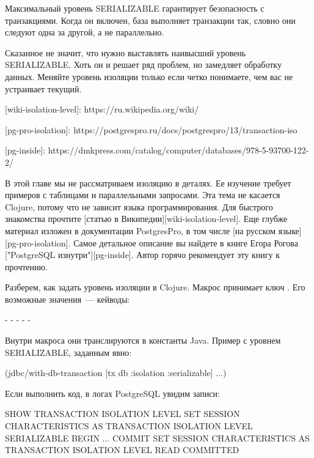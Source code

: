 Максимальный уровень SERIALIZABLE гарантирует безопасность с транзакциями. Когда он включен, база выполняет транзакции так, словно они следуют одна за другой, а не параллельно.

Сказанное не значит, что нужно выставлять наивысший уровень SERIALIZABLE. Хоть он и решает ряд проблем, но замедляет обработку данных. Меняйте уровень изоляции только если четко понимаете, чем вас не устраивает текущий.

[wiki-isolation-level]: https://ru.wikipedia.org/wiki/%

[pg-pro-isolation]: https://postgrespro.ru/docs/postgrespro/13/transaction-iso

[pg-inside]: https://dmkpress.com/catalog/computer/databases/978-5-93700-122-2/

В этой главе мы не рассматриваем изоляцию в деталях. Ее изучение требует примеров с таблицами и параллельными запросами. Эта тема не касается Clojure, потому что не зависит языка программирования. Для быстрого знакомства прочтите [статью в Википедии][wiki-isolation-level]. Еще глубже материал изложен в документации PostgresPro, в том числе [на русском языке][pg-pro-isolation]. Самое детальное описание вы найдете в книге Егора Рогова ["PostgreSQL изнутри"][pg-inside]. Автор горячо рекомендует эту книгу к прочтению.

Разберем, как задать уровень изоляции в Clojure. Макрос  принимает ключ . Его возможные значения~--- кейводы:

- 
- 
- 
- 
- 

Внутри макроса они транслируются в константы Java. Пример с уровнем SERIALIZABLE, заданным явно:

\begin{english}
  \begin{clojure}
(jdbc/with-db-transaction
  [tx db {:isolation :serializable}]
  ...)
  \end{clojure}
\end{english}

Если выполнить код, в логах PostgreSQL увидим записи:

\begin{english}
  \begin{sql}
SHOW TRANSACTION ISOLATION LEVEL
SET SESSION CHARACTERISTICS AS TRANSACTION ISOLATION LEVEL SERIALIZABLE
BEGIN
...
COMMIT
SET SESSION CHARACTERISTICS AS TRANSACTION ISOLATION LEVEL READ COMMITTED
  \end{sql}
\end{english}


